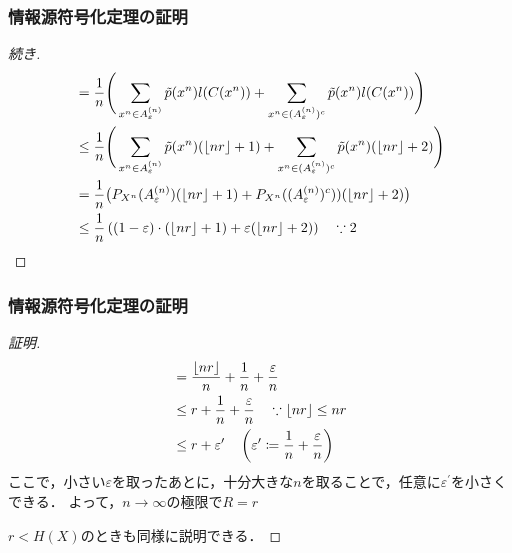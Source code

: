 \documentclass{classes/myslide}
\begin{document}
\begin{frame}\frametitle{情報源符号化定理の証明}
  \begin{proof}[続き]
    \begin{align*}
      &= \frac{1}{n} \Bigg \lparen \sum_{x^n \in A_{\varepsilon}^{(n)}} \tilde{p}(x^n)l(C(x^n)) 
        + \sum_{x^n \in (A_{\varepsilon}^{(n)})^c} \tilde{p}(x^n)l(C(x^n)) \Bigg \rparen \\
      &\leq \frac{1}{n} \Bigg \lparen \sum_{x^n \in A_{\varepsilon}^{(n)}} \tilde{p}(x^n) (\lfloor nr \rfloor + 1) 
          + \sum_{x^n \in (A_{\varepsilon}^{(n)})^c} \tilde{p}(x^n) (\lfloor nr \rfloor + 2) \Bigg \rparen \\
      &= \frac{1}{n} \big \lparen P_{X^n}(A_{\varepsilon}^{(n)})  (\lfloor nr \rfloor + 1) 
        + P_{X^n}((A_{\varepsilon}^{(n)})^c) \rparen (\lfloor nr \rfloor + 2) \big \rparen \\
        &\leq \frac{1}{n} \left \lparen (1-\varepsilon) \cdot (\lfloor nr \rfloor + 1)  + \varepsilon (\lfloor nr \rfloor + 2)   \right \rparen \quad \because 2 
    \end{align*}
    \let\qedsymbol\relax
  \end{proof}
\end{frame}

\begin{frame}\frametitle{情報源符号化定理の証明}
  \begin{proof}[証明]
    \begin{align*}
      &= \frac{\lfloor nr \rfloor}{n} + \frac{1}{n} + \frac{\varepsilon}{n} \\
      &\leq r + \frac{1}{n} + \frac{\varepsilon}{n} \quad \because \lfloor nr \rfloor \leq nr \\
      &\leq r + \varepsilon^{\prime} \quad \left \lparen \varepsilon^{\prime} \coloneq \frac{1}{n} + \frac{\varepsilon}{n} \right \rparen
    \end{align*}
    ここで，小さい$\varepsilon$を取ったあとに，十分大きな$n$を取ることで，任意に$\varepsilon^{\prime}$を小さくできる．
    よって，$n \to \infty$の極限で$R = r$

    $r < H(X)$のときも同様に説明できる．
  \end{proof}
\end{frame}
\end{document}
